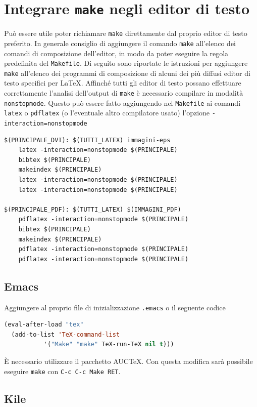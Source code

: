 \cleardoublepage{}
\chapter{Integrare \texttt{make} negli editor di testo}
\label{cha:editor}

Può essere utile poter richiamare \texttt{make} direttamente dal proprio editor
di testo preferito.  In generale consiglio di aggiungere il comando
\texttt{make} all'elenco dei comandi di composizione dell'editor, in modo da
poter eseguire la regola predefinita del \texttt{Makefile}.  Di seguito sono
riportate le istruzioni per aggiungere \texttt{make} all'elenco dei programmi di
composizione di alcuni dei più diffusi editor di testo specifici per \LaTeX{}.
Affinché tutti gli editor di testo possano effettuare correttamente l'analisi
dell'output di \texttt{make} è necessario compilare in modalità
\texttt{nonstopmode}.  Questo può essere fatto aggiungendo nel \texttt{Makefile}
ai comandi \texttt{latex} o \texttt{pdflatex} (o l'eventuale altro compilatore
usato) l'opzione \texttt{-interaction=nonstopmode}
\begin{lstlisting}
$(PRINCIPALE_DVI): $(TUTTI_LATEX) immagini-eps
	latex -interaction=nonstopmode $(PRINCIPALE)
	bibtex $(PRINCIPALE)
	makeindex $(PRINCIPALE)
	latex -interaction=nonstopmode $(PRINCIPALE)
	latex -interaction=nonstopmode $(PRINCIPALE)

$(PRINCIPALE_PDF): $(TUTTI_LATEX) $(IMMAGINI_PDF)
	pdflatex -interaction=nonstopmode $(PRINCIPALE)
	bibtex $(PRINCIPALE)
	makeindex $(PRINCIPALE)
	pdflatex -interaction=nonstopmode $(PRINCIPALE)
	pdflatex -interaction=nonstopmode $(PRINCIPALE)
\end{lstlisting}

\section{Emacs}
\label{sec:emacs}

Aggiungere al proprio file di inizializzazione \texttt{.emacs} o il seguente codice
\begin{lstlisting}[language=lisp,morekeywords={eval-after-load,add-to-list}]
(eval-after-load "tex"
  (add-to-list 'TeX-command-list
	       '("Make" "make" TeX-run-TeX nil t)))
\end{lstlisting}
È necessario utilizzare il pacchetto AUC\TeX{}.
Con questa modifica sarà possibile eseguire \texttt{make} con
\texttt{C-c C-c Make RET}.

\section{Kile}
\label{sec:kile}

